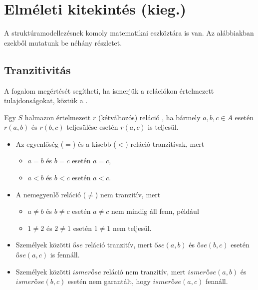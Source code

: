 
\section{Elméleti kitekintés (kieg.)}

A struktúramodellezésnek komoly matematikai eszköztára is van. Az alábbiakban ezekből mutatunk be néhány részletet.

\subsection{Tranzitivitás}

A  fogalom megértését segítheti, ha ismerjük a relációkon értelmezett tulajdonságokat, köztük a .

Egy $S$ halmazon értelmezett $r$ (kétváltozós) reláció , ha bármely $a,b,c \in A$ esetén $r(a, b)$ és $r(b, c)$ teljesülése esetén $r(a, c)$ is teljesül.

\begin{itemize}
	\item Az egyenlőség ($=$) és a kisebb ($<$) reláció tranzitívak, mert
	\begin{itemize}
		\item $a = b$ és $b = c$ esetén $a = c$,
		\item $a < b$ és $b < c$ esetén $a < c$.
	\end{itemize}
	\item A nemegyenlő reláció ($\neq$) nem tranzitív, mert 
	\begin{itemize}
		\item $a \neq b$ és $b \neq c$ esetén $a \neq c$ nem mindig áll fenn, például
		\item $1 \neq 2$ és $2 \neq 1$ esetén $1 \neq 1$ nem teljesül.
	\end{itemize}
	\item Személyek közötti $\mathit{őse}$ reláció tranzitív, mert $\mathit{őse}(a, b)$ és $\mathit{őse}(b, c)$ esetén $\mathit{őse}(a, c)$ is fennáll. 
	\item Személyek közötti $\mathit{ismerőse}$ reláció nem tranzitív, mert $\mathit{ismerőse}(a, b)$ és $\mathit{ismerőse}(b, c)$ esetén nem garantált, hogy $\mathit{ismerőse}(a, c)$ fennáll.
\end{itemize}


